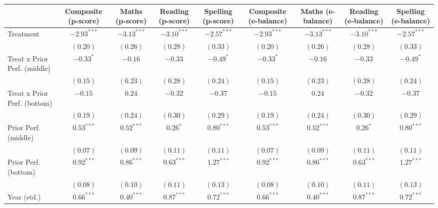 
\begin{table}
\begin{center}
\begin{tabular}{l c c c c c c c c}
\hline
 & Composite (p-score) & Maths (p-score) & Reading (p-score) & Spelling (p-score) & Composite (e-balance) & Maths (e-balance) & Reading (e-balance) & Spelling (e-balance) \\
\hline
Treatment                    & $-2.93^{***}$ & $-3.13^{***}$ & $-3.10^{***}$ & $-2.57^{***}$ & $-2.93^{***}$ & $-3.13^{***}$ & $-3.10^{***}$ & $-2.57^{***}$ \\
                             & $(0.20)$      & $(0.26)$      & $(0.28)$      & $(0.33)$      & $(0.20)$      & $(0.26)$      & $(0.28)$      & $(0.33)$      \\
Treat x Prior Perf. (middle) & $-0.33^{*}$   & $-0.16$       & $-0.33$       & $-0.49^{*}$   & $-0.33^{*}$   & $-0.16$       & $-0.33$       & $-0.49^{*}$   \\
                             & $(0.15)$      & $(0.23)$      & $(0.28)$      & $(0.24)$      & $(0.15)$      & $(0.23)$      & $(0.28)$      & $(0.24)$      \\
Treat x Prior Perf. (bottom) & $-0.15$       & $0.24$        & $-0.32$       & $-0.37$       & $-0.15$       & $0.24$        & $-0.32$       & $-0.37$       \\
                             & $(0.19)$      & $(0.24)$      & $(0.30)$      & $(0.29)$      & $(0.19)$      & $(0.24)$      & $(0.30)$      & $(0.29)$      \\
Prior Perf. (middle)         & $0.53^{***}$  & $0.52^{***}$  & $0.26^{*}$    & $0.80^{***}$  & $0.53^{***}$  & $0.52^{***}$  & $0.26^{*}$    & $0.80^{***}$  \\
                             & $(0.07)$      & $(0.09)$      & $(0.11)$      & $(0.11)$      & $(0.07)$      & $(0.09)$      & $(0.11)$      & $(0.11)$      \\
Prior Perf. (bottom)         & $0.92^{***}$  & $0.86^{***}$  & $0.63^{***}$  & $1.27^{***}$  & $0.92^{***}$  & $0.86^{***}$  & $0.63^{***}$  & $1.27^{***}$  \\
                             & $(0.08)$      & $(0.10)$      & $(0.11)$      & $(0.13)$      & $(0.08)$      & $(0.10)$      & $(0.11)$      & $(0.13)$      \\
Year (std.)                  & $0.66^{***}$  & $0.40^{***}$  & $0.87^{***}$  & $0.72^{***}$  & $0.66^{***}$  & $0.40^{***}$  & $0.87^{***}$  & $0.72^{***}$  \\

\end{tabular}
\end{center}
\end{table}
